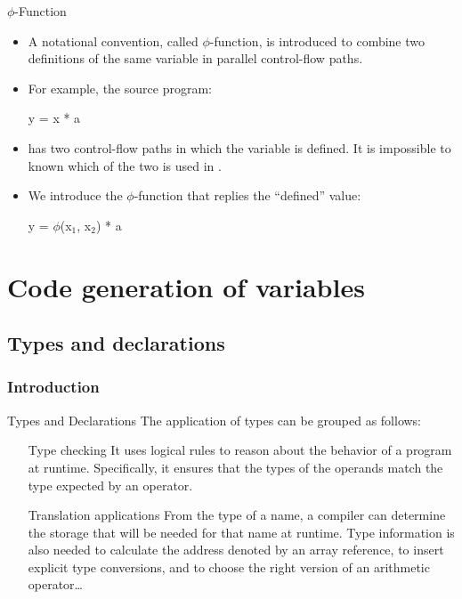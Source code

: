 \begin{bibunit}[apalike]
\begin{frame}{$\phi$-Function}
	\begin{itemize}
	\item A notational convention, called $\phi$-function, is introduced to combine two definitions of the same variable in parallel control-flow paths.
	\item For example, the source program:
		\begin{myalgorithm}
			\;
			\;
			y = x * a\;
		\end{myalgorithm}
	\item has two control-flow paths in which the variable  is defined. It is impossible to known which of the two  is used in \tactext{x * a}.
	\item We introduce the $\phi$-function that replies the ``defined'' value:
		\begin{myalgorithm}
			\lIf{flag}{x$_1$ = -1}\;
			\lElse{x$_2$ = 1}\;
			y = $\phi$(x$_1$, x$_2$) * a\;
		\end{myalgorithm}
	\end{itemize}
\end{frame}

\section[Generation of variables]{Code generation of variables}

\tableofcontentslide[sections={2-6},sectionstyle={show/shaded},subsectionstyle={show/show/hide},subsubsectionstyle={hide/hide/hide/hide}]

\subsection{Types and declarations}

\subsubsection{Introduction}

\tableofcontentslide[sections={2-6},sectionstyle={show/shaded},subsectionstyle={show/shaded/hide},subsubsectionstyle={show/show/hide/hide}]

\begin{frame}{Types and Declarations}
	The application of types can be grouped as follows:
	\vfill
	\begin{enumerate}
	\item[Type checking] It uses logical rules to reason about the behavior of a program at runtime. Specifically, it ensures that the types of the operands match the type expected by an operator.
	\vfill
	\item[Translation applications] From the type of a name, a compiler can determine the storage that will be needed for that name at runtime. Type information is also needed to calculate the address denoted by an array reference, to insert explicit type conversions, and to choose the right version of an arithmetic operator\dots
	\end{enumerate}
\end{frame}


\end{bibunit}
